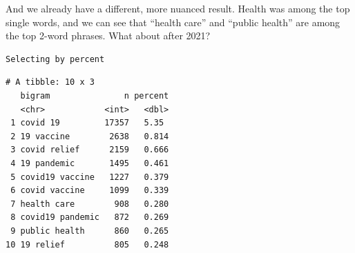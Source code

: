 \documentclass[
  letterpaper,
  DIV=11,
  numbers=noendperiod]{scrreprt}
\newenvironment{Shaded}{\begin{snugshade}}{\end{snugshade}}
\newcommand{\AttributeTok}[1]{\textcolor[rgb]{0.40,0.45,0.13}{#1}}
\newcommand{\ConstantTok}[1]{\textcolor[rgb]{0.56,0.35,0.01}{#1}}
\newcommand{\DecValTok}[1]{\textcolor[rgb]{0.68,0.00,0.00}{#1}}
\newcommand{\FunctionTok}[1]{\textcolor[rgb]{0.28,0.35,0.67}{#1}}
\newcommand{\NormalTok}[1]{\textcolor[rgb]{0.00,0.23,0.31}{#1}}
\newcommand{\SpecialCharTok}[1]{\textcolor[rgb]{0.37,0.37,0.37}{#1}}
\newcommand{\StringTok}[1]{\textcolor[rgb]{0.13,0.47,0.30}{#1}}
\begin{document}
And we already have a different, more nuanced result. Health was among
the top single words, and we can see that ``health care'' and ``public
health'' are among the top 2-word phrases. What about after 2021?

\begin{Shaded}
\end{Shaded}

\begin{verbatim}
Selecting by percent
\end{verbatim}

\begin{verbatim}
# A tibble: 10 x 3
   bigram               n percent
   <chr>            <int>   <dbl>
 1 covid 19         17357   5.35 
 2 19 vaccine        2638   0.814
 3 covid relief      2159   0.666
 4 19 pandemic       1495   0.461
 5 covid19 vaccine   1227   0.379
 6 covid vaccine     1099   0.339
 7 health care        908   0.280
 8 covid19 pandemic   872   0.269
 9 public health      860   0.265
10 19 relief          805   0.248
\end{verbatim}
\end{document}
